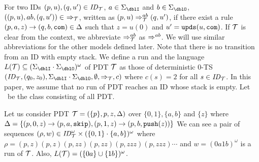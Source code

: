 For two IDs $(p, u), (q, u')\in \mathit{ID}_{\cal T}$,
$a\in\Sigma_\dblI$ and $b\in\Sigma_\dblO$,
$((p, u), ab, (q, u'))\in\ \Rightarrow_\calT$,
written as $(p, u) \Rightarrow_{{\cal T}}^{ab} (q, u')$,
if there exist a rule $(p, a, z) \rightarrow (q, b, \mathtt{com}) \in \Delta$
such that $z=u(0)$ and $u'=\mathtt{upds}(u,\mathtt{com})$.
If ${\cal T}$ is clear from the context,
we abbreviate
$\Rightarrow_{{\cal T}}^{ab}$ as $\Rightarrow^{ab}$.
We will use similar abbreviations for the other models defined later.
Note that there is no transition from an ID with empty stack.
We define a run and the language $L(\calT)\subseteq (\Sigma_\dblI \cdot \Sigma_\dblO)^{\omega}$ of PDT ${\cal T}$ as those of
deterministic $0$-TS $(\ID_\calT, (q_0,z_0), \Sigma_\dblI\cdot\Sigma_\dblO, \emptyset, \Rightarrow_\calT, c)$ where $c(s)=2$ for all $s\in\mathit{ID}_{\cal T}$.
In this paper,
we assume that no run of PDT reaches an ID whose stack is empty.
Let \PDT\ be the class consisting of all PDT.

\begin{example}
\label{ex: PDT}
Let us consider PDT
${\cal T} = (\{p\},p,z,\Delta)$
over $\{0,1\},\{a,b\}$ and $\{z\}$ where
$\Delta = \{
(p, 0, z) \rightarrow (p, a, \mathtt{skip}),
(p, 1, z) \rightarrow (p, b, \mathtt{push}(z))
\}$
We can see
a pair of sequences $(\rho,w)\in \mathit{ID}_{\cal T}^\omega\times (\{0,1\}\cdot\{a,b\})^\omega$ where
$\rho=(p,z)(p,z)(p,zz)(p,zz)(p,zzz)(p,zzz)\cdots$
and $w=(0a1b)^\omega$
is a run of ${\cal T}$.
Also, $L({\cal T})=(\{0a\}\cup\{1b\})^\omega$.
\end{example}


